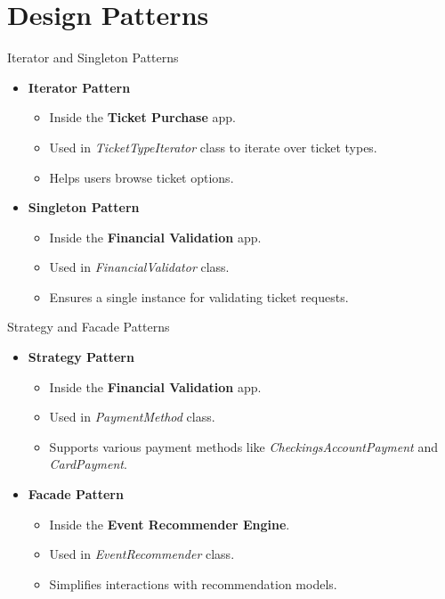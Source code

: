 \documentclass{beamer}
\begin{document}
\section{Design Patterns}
\begin{frame}{Iterator and Singleton Patterns}
    \begin{itemize}
        \item \textbf{Iterator Pattern}
        \begin{itemize}
            \item Inside the \textbf{Ticket Purchase} app.
            \item Used in \textit{TicketTypeIterator} class to iterate over ticket types.
            \item Helps users browse ticket options.
        \end{itemize}
        \item \textbf{Singleton Pattern}
        \begin{itemize}
            \item Inside the \textbf{Financial Validation} app.
            \item Used in \textit{FinancialValidator} class.
            \item Ensures a single instance for validating ticket requests.
        \end{itemize}
    \end{itemize}
\end{frame}

\begin{frame}{Strategy and Facade Patterns}
    \begin{itemize}
        \item \textbf{Strategy Pattern}
        \begin{itemize}
            \item Inside the \textbf{Financial Validation} app.
            \item Used in \textit{PaymentMethod} class.
            \item Supports various payment methods like \textit{CheckingsAccountPayment} and \textit{CardPayment}.
        \end{itemize}
        \item \textbf{Facade Pattern}
        \begin{itemize}
            \item Inside the \textbf{Event Recommender Engine}.
            \item Used in \textit{EventRecommender} class.
            \item Simplifies interactions with recommendation models.
        \end{itemize}
    \end{itemize}
\end{frame}
\end{document}
